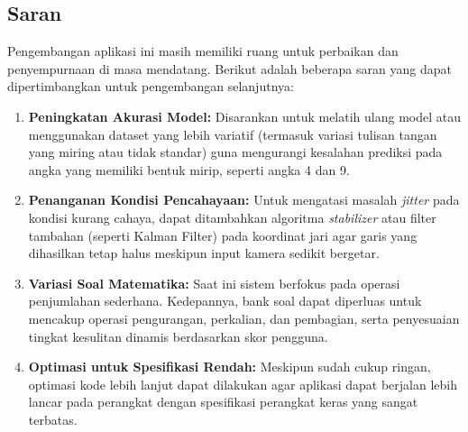 \subsection{Saran}
Pengembangan aplikasi ini masih memiliki ruang untuk perbaikan dan penyempurnaan di masa mendatang. Berikut adalah beberapa saran yang dapat dipertimbangkan untuk pengembangan selanjutnya:

\begin{enumerate}
    \item \textbf{Peningkatan Akurasi Model:}
    Disarankan untuk melatih ulang model atau menggunakan dataset yang lebih variatif (termasuk variasi tulisan tangan yang miring atau tidak standar) guna mengurangi kesalahan prediksi pada angka yang memiliki bentuk mirip, seperti angka 4 dan 9.

    \item \textbf{Penanganan Kondisi Pencahayaan:}
    Untuk mengatasi masalah \textit{jitter} pada kondisi kurang cahaya, dapat ditambahkan algoritma \textit{stabilizer} atau filter tambahan (seperti Kalman Filter) pada koordinat jari agar garis yang dihasilkan tetap halus meskipun input kamera sedikit bergetar.

    \item \textbf{Variasi Soal Matematika:}
    Saat ini sistem berfokus pada operasi penjumlahan sederhana. Kedepannya, bank soal dapat diperluas untuk mencakup operasi pengurangan, perkalian, dan pembagian, serta penyesuaian tingkat kesulitan dinamis berdasarkan skor pengguna.

    \item \textbf{Optimasi untuk Spesifikasi Rendah:}
    Meskipun sudah cukup ringan, optimasi kode lebih lanjut dapat dilakukan agar aplikasi dapat berjalan lebih lancar pada perangkat dengan spesifikasi perangkat keras yang sangat terbatas.
\end{enumerate}

\newpage
